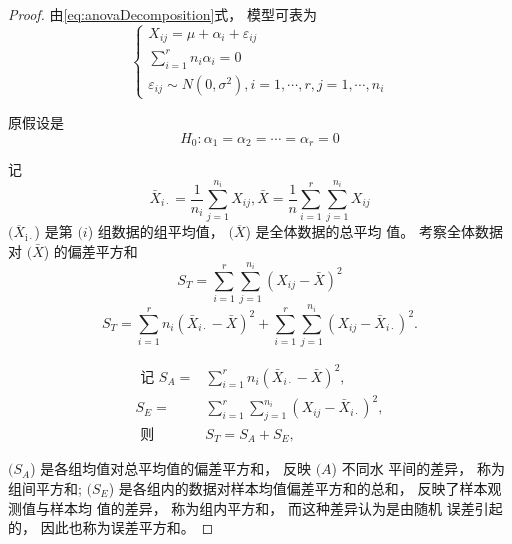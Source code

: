 \begin{proof}
    由\cref{eq:anovaDecomposition}式， 模型可表为
    \begin{equation}
    \left\{\begin{array}{l}
    {X}_{i j}=\mu+\alpha_{i}+\varepsilon_{i j} \\
    \sum_{i=1}^{r} {n}_{i} \alpha_{i}={0} \\
    \varepsilon_{i j} \sim N\left({0}, \sigma^{2}\right), i=1, \cdots, r, j=1, \cdots, n_{i}
    \end{array}\right.
    \end{equation}
    
    原假设是
    \begin{equation}
    H_{0}: \alpha_{1}=\alpha_{2}=\cdots=\alpha_{r}=0
    \end{equation}
    
    记
    \begin{equation}
    \bar{X}_{i \cdot}=\frac{1}{n_{i}} \sum_{j=1}^{n_{i}} X_{i j}, \bar{X}=\frac{1}{n} \sum_{i=1}^{r} \sum_{j=1}^{n_{i}} X_{i j}
    \end{equation}
    $( \overline{{X}}_{\mathrm{i} \cdot} $) 是第 $( {i} $) 组数据的组平均值， $( \overline{{X}} $) 是全体数据的总平均
    值。 考察全体数据对 $( \bar{X} $) 的偏差平方和
    \begin{equation}
    S_{T}=\sum_{i=1}^{r} \sum_{j=1}^{n_{i}}\left(X_{i j}-\bar{X}\right)^{2}
    \end{equation}
    \begin{equation}
    S_{T}=\sum_{i=1}^{r} n_{i}\left(\bar{X}_{i \cdot}-\bar{X}\right)^{2}+\sum_{i=1}^{r} \sum_{j=1}^{n_{i}}\left(X_{i j}-\bar{X}_{i \cdot}\right)^{2} .
    \end{equation}
    
    \begin{equation} \begin{aligned} \text { 记 } S_{A}=& \sum_{i=1}^{r} n_{i}\left(\bar{X}_{i \cdot}-\bar{X}\right)^{2}, \\ S_{E}=& \sum_{i=1}^{r} \sum_{j=1}^{n_{i}}\left(X_{i j}-\bar{X}_{i \cdot}\right)^{2}, \\ \text { 则 } & S_{T}=S_{A}+S_{E}, \end{aligned} \end{equation}
    
    $( {S}_{{A}} $) 是各组均值对总平均值的偏差平方和， 反映 $( {A} $) 不同水
    平间的差异， 称为组间平方和; $( {S}_{E} $) 是各组内的数据对样本均值偏差平方和的总和， 反映了样本观测值与样本均
    值的差异， 称为组内平方和， 而这种差异认为是由随机
    误差引起的， 因此也称为误差平方和。 
    

\end{proof}
